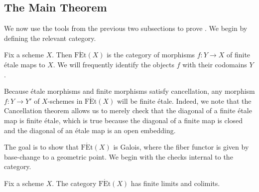 \documentclass{amsart}
\begin{document}
\subsection{The Main Theorem} \label{subsec:main-thm}
We now use the tools from the previous two subsections to prove . We begin by defining the relevant category.
\begin{definition}
    Fix a scheme $X$. Then $\mathrm{F\acute Et}(X)$ is the category of morphisms $f\colon Y\to X$ of finite \'etale maps to $X$. We will frequently identify the objects $f$ with their codomains $Y$.
\end{definition}
\begin{remark}
    Because \'etale morphisms and finite morphisms satisfy cancellation, any morphism $f\colon Y\to Y'$ of $X$-schemes in $\mathrm{F\acute Et}(X)$ will be finite \'etale. Indeed, we note that the Cancellation theorem \cite[Theorem~11.2.1]{rising-sea} allows us to merely check that the diagonal of a finite \'etale map is finite \'etale, which is true because the diagonal of a finite map is closed and the diagonal of an \'etale map is an open embedding.
\end{remark}
The goal is to show that $\mathrm{F\acute Et}(X)$ is Galois, where the fiber functor is given by base-change to a geometric point. We begin with the checks internal to the category.
\begin{proposition} \label{prop:fet-limits-colimits}
    Fix a scheme $X$. The category $\mathrm{F\acute Et}(X)$ has finite limits and colimits.
\end{proposition}
\end{document}
